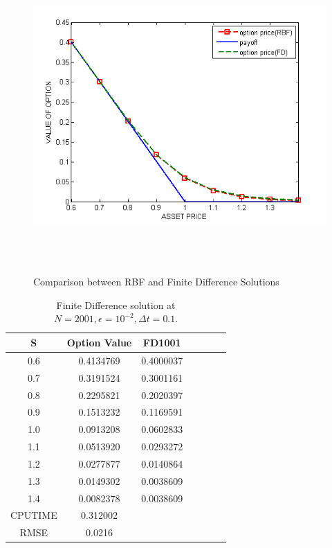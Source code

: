 \documentclass[12pt]{article}
\numberwithin{equation}{section} %
\begin{document}
\newpage
\begin{figure}[h]
\begin{centering}
\includegraphics[height=4in]{rbffdpo.png}\
\caption{Comparison between RBF and Finite Difference Solutions }
\vskip -0.5in \vskip -0.5in
\end{centering}
\end{figure}

\begin{table}[h]
\centering
\begin{tabular}{|c|c|c|c|c|c|c|}
  \hline
  S &  Option Value& FD1001  \\
  \hline

  0.6 & 0.4134769 &0.4000037 \\
  0.7 &0.3191524&0.3001161 \\
  0.8 &0.2295821& 0.2020397 \\
  0.9 & 0.1513232&0.1169591  \\
  1.0 & 0.0913208&0.0602833 \\
  1.1 & 0.0513920&0.0293272\\
  1.2 & 0.0277877&0.0140864 \\
  1.3 & 0.0149302 &0.0038609 \\
  1.4& 0.0082378&0.0038609 \\
 \hline
CPUTIME&0.312002&\\
\hline
 RMSE&0.0216&\\
  \hline

\end{tabular}
  \caption{Finite Difference solution at $N=2001,\epsilon=10^{-2},\Delta t=0.1$.}\label{Tab_}
\end{table}
\end{document}
